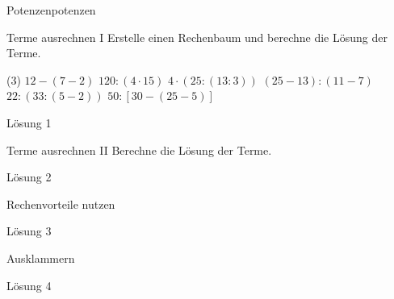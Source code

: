 \documentclass[lerntheke,12pt,a5paper,landscape]{arbeitsblatt}
\begin{document}
\begin{loesungskarte}%
\end{loesungskarte}

\begin{hilfekarte}{Potenzen}{potenzen}

\end{hilfekarte}

\begin{loesungskarte}%
\end{loesungskarte}




\begin{karte1}{Terme ausrechnen I}
	Erstelle einen Rechenbaum und berechne die Lösung der Terme.

	\begin{tasks}(3)
		\task $12 - (7 - 2)$
		\task $120 : (4\cdot  15)$
		\task $4\cdot (25 : (13:3))$
		\task $(25-13) : (11-7)$
		\task $22 : (33 : (5-2))$
		\task $50 : [30 - (25-5)]$
	\end{tasks}
\end{karte1}

\begin{loesungskarte}{Lösung 1}

\end{loesungskarte}

\begin{karte2}{Terme ausrechnen II}
	Berechne die Lösung der Terme.
\end{karte2}

\begin{loesungskarte}{Lösung 2}

\end{loesungskarte}

\begin{karte1}{Rechenvorteile nutzen}

\end{karte1}

\begin{loesungskarte}{Lösung 3}

\end{loesungskarte}

\begin{karte1}{Ausklammern}

\end{karte1}

\begin{loesungskarte}{Lösung 4}

\end{loesungskarte}
\end{document}
